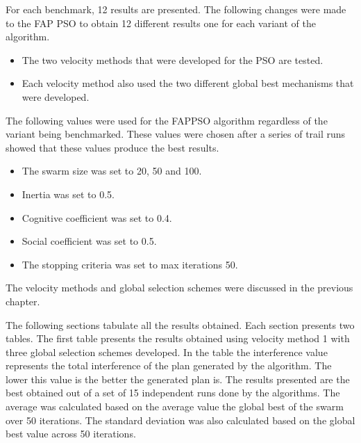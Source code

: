 For each benchmark, 12 results are presented. The following changes were made to the FAP PSO to obtain 12 different results one for each variant of the algorithm.
\begin{itemize}
\item The two velocity methods that were developed for the PSO are tested.
\item Each velocity method also used the two different global best mechanisms that were developed.
\end{itemize}
The following values were used for the FAPPSO algorithm regardless of the variant being benchmarked. These values were chosen after a series of trail runs showed that these values produce the best results.
\begin{itemize}
\item The swarm size was set to 20, 50 and 100.
\item Inertia was set to 0.5.
\item Cognitive coefficient was set to 0.4.
\item Social coefficient was set to 0.5.
\item The stopping criteria was set to max iterations 50.
\end{itemize}
The velocity methods and global selection schemes were discussed in the previous chapter.

The following sections tabulate all the results obtained. Each section presents two tables. The first table presents the results obtained using velocity method 1 with three global selection schemes developed. In the table the interference value represents the total interference of the plan generated by the algorithm. The lower this value is the better the generated plan is. The results presented are the best obtained out of a set of 15 independent runs done by the algorithms. The average was calculated based on the average value the global best of the swarm over 50 iterations. The standard deviation was also calculated based on the global best value across 50 iterations.
